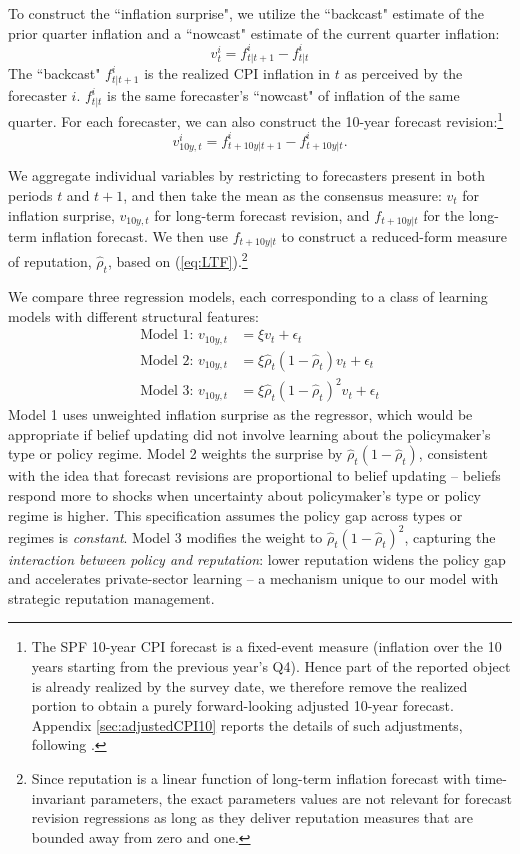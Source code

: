 \documentclass[12pt,letter,leqno]{article}
\theoremstyle{asn}
\theoremstyle{lem}
\theoremstyle{slem}
\theoremstyle{prop}
\theoremstyle{appprop}
\theoremstyle{rem}
\theoremstyle{defn}
\begin{document}
To construct the ``inflation surprise", we utilize the ``backcast" estimate of the prior quarter inflation and a ``nowcast" estimate of the current quarter inflation: 
\[
v_{t}^{i}=f_{t|t+1}^{i}-f_{t|t}^{i}
\]
The ``backcast" $f_{t|t+1}^{i}$ is the realized CPI inflation in $t$ as perceived by the forecaster $i$. $f_{t|t}^{i}$ is the same forecaster's ``nowcast" of inflation of the same quarter. 
For each forecaster, we can also construct the 10-year forecast revision:\footnote{The SPF 10-year CPI forecast is a fixed-event measure (inflation over the 10 years starting from the previous year’s Q4). Hence part of the reported object is already realized by the survey date, we therefore remove the realized portion to obtain a purely forward-looking adjusted 10-year forecast. Appendix \ref{sec:adjustedCPI10} reports the details of such adjustments, following \cite{aruoba_term_2020}.}
\[
v_{10y,t}^{i}=f_{t+10y|t+1}^{i}-f_{t+10y|t}^{i}.
\]

We aggregate individual variables by restricting to forecasters present in both periods $t$ and $t+1$, and then take the mean as the consensus measure: $v_t$ for inflation surprise, $v_{10y,t}$ for long-term forecast revision, and $f_{t+10y|t}$ for the long-term inflation forecast. We then use $f_{t+10y|t}$ to construct a reduced-form measure of reputation, $\widehat{\rho}_t$, based on (\ref{eq:LTF}).\footnote{Since reputation is a linear function of long-term inflation forecast with time-invariant parameters, the exact parameters values are not relevant for forecast revision regressions as long as they deliver reputation measures that are bounded away from zero and one.}

We compare three regression models, each corresponding to a class of learning models with different structural features:
\begin{align*}
     \text{Model 1: }v_{10y,t}&=\xi v_t + \epsilon_t \\
     \text{Model 2: }v_{10y,t}&=\xi \widehat{\rho}_t(1-\widehat{\rho}_t) v_t + \epsilon_t \\
     \text{Model 3: }v_{10y,t}&=\xi \widehat{\rho}_t(1-\widehat{\rho}_t)^2 v_t + \epsilon_t
\end{align*}
Model 1 uses unweighted inflation surprise as the regressor, which would be appropriate if belief updating did not involve learning about the policymaker’s type or policy regime. Model 2 weights the surprise by $\widehat{\rho}_t(1 - \widehat{\rho}_t)$, consistent with the idea that forecast revisions are proportional to belief updating -- beliefs respond more to shocks when uncertainty about policymaker's type or policy regime is higher. This specification assumes the policy gap across types or regimes is \textit{constant}. Model 3 modifies the weight to $\widehat{\rho}_t(1 - \widehat{\rho}_t)^2$, capturing the \textit{interaction between policy and reputation}: lower reputation widens the policy gap and accelerates private-sector learning -- a mechanism unique to our model with strategic reputation management. 
\end{document}
